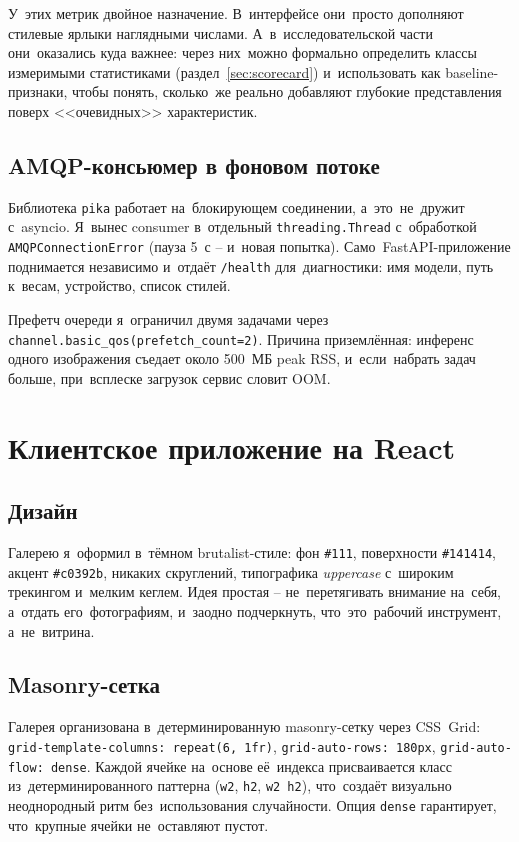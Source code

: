 \documentclass[a4paper,12pt]{diplom}
\begin{document}
У~этих метрик двойное назначение. В~интерфейсе они~просто дополняют стилевые ярлыки наглядными числами. А~в~исследовательской части они~оказались куда важнее: через них~можно формально определить классы измеримыми статистиками (раздел~\ref{sec:scorecard}) и~использовать как baseline-признаки, чтобы понять, сколько~же реально добавляют глубокие представления поверх <<очевидных>> характеристик.

\subsection{AMQP-консьюмер в фоновом потоке}

Библиотека \texttt{pika} работает на~блокирующем соединении, а~это~не~дружит с~asyncio. Я~вынес consumer в~отдельный \texttt{threading.Thread} с~обработкой \texttt{AMQPConnectionError} (пауза 5~с -- и~новая попытка). Само~FastAPI-приложение поднимается независимо и~отдаёт \verb|/health| для~диагностики: имя модели, путь к~весам, устройство, список стилей.

Префетч очереди я~ограничил двумя задачами через \verb|channel.basic_qos(prefetch_count=2)|. Причина приземлённая: инференс одного изображения съедает около 500~МБ peak RSS, и~если~набрать задач больше, при~всплеске загрузок сервис словит OOM.

\section{Клиентское приложение на React}
\label{sec:frontend}

\subsection{Дизайн}

Галерею я~оформил в~тёмном brutalist-стиле: фон \verb|#111|, поверхности \verb|#141414|, акцент \verb|#c0392b|, никаких скруглений, типографика \emph{uppercase} с~широким трекингом и~мелким кеглем. Идея простая -- не~перетягивать внимание на~себя, а~отдать его~фотографиям, и~заодно подчеркнуть, что~это~рабочий инструмент, а~не~витрина.

\subsection{Masonry-сетка}

Галерея организована в~детерминированную masonry-сетку через CSS~Grid: \verb|grid-template-columns: repeat(6, 1fr)|, \verb|grid-auto-rows: 180px|, \verb|grid-auto-flow: dense|. Каждой ячейке на~основе её~индекса присваивается класс из~детерминированного паттерна (\verb|w2|, \verb|h2|, \verb|w2 h2|), что~создаёт визуально неоднородный ритм без~использования случайности. Опция \verb|dense| гарантирует, что~крупные ячейки не~оставляют пустот.
\end{document}
